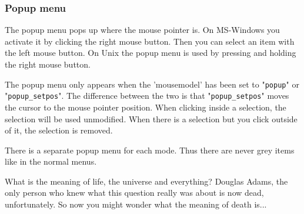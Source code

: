 \subsubsection{Popup menu}
The popup menu pops up where the mouse pointer is.
On MS-Windows you activate it by clicking the right mouse button.
Then you can select an item with the left mouse button.
On Unix the popup menu is used by pressing and holding the right mouse button.

The popup menu only appears when the 'mousemodel' has been set to "\verb!popup!" or "\verb!popup_setpos!".
The difference between the two is that "\verb!popup_setpos!" moves the cursor to the mouse pointer position.
When clicking inside a selection, the selection will be used unmodified.
When there is a selection but you click outside of it, the selection is removed.

There is a separate popup menu for each mode.
Thus there are never grey items like in the normal menus.

\label{42}
What is the meaning of life, the universe and everything?
Douglas Adams, the only person who knew what this question really was about is now dead, unfortunately.
So now you might wonder what the meaning of death is...
\clearpage
